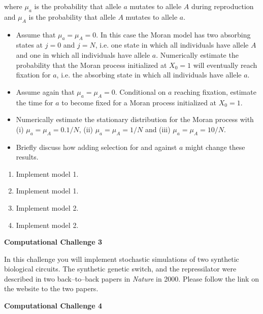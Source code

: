 \documentclass[12pt]{article}
\begin{document}
where $\mu_a$ is the probability that allele $a$ mutates to allele $A$ during reproduction and $\mu_A$ is the probability that allele $A$ mutates to allele $a$.   

\begin{itemize}
\item Assume that $\mu_a=\mu_A=0$. In this case the Moran model has two absorbing states at $j=0$ and $j=N$, i.e. one state in which all individuals have allele $A$ and one in which all individuals have allele $a$. Numerically estimate the probability that the Moran process initialized at $X_0=1$ will eventually reach fixation for $a$, i.e. the absorbing state in which all individuals have allele $a$.
\item Assume again that $\mu_a=\mu_A=0$. Conditional on $a$ reaching fixation, estimate the time for $a$ to become fixed for a Moran process initialized at $X_0=1$.
\item Numerically estimate the stationary distribution for the Moran process with (i) $\mu_a=\mu_A=0.1/N$,  (ii) $\mu_a=\mu_A=1/N$ and  (iii) $\mu_a=\mu_A=10/N$.
\item Briefly discuss how adding selection for and against $a$ might change these results.
\end{itemize}

\begin{enumerate}
\item[\bf Group 1] Implement model 1.
\item[\bf Group 2] Implement model 1.
\item[\bf Group 3] Implement model 2.
\item[\bf Group 4] Implement model 2.
\end{enumerate}


\begin{center}
{\Large \bf Computational Challenge 3
\\ \vskip5mm  }
\end{center}

In this challenge you will implement stochastic simulations of two synthetic biological circuits.
The synthetic genetic switch, and the repressilator were described in two back--to--back papers
in \emph{Nature} in 2000.  Please follow the link on the website to the two papers. 




\begin{center}
{\Large \bf Computational Challenge 4
\\ \vskip5mm }
\end{center}
\end{document}
